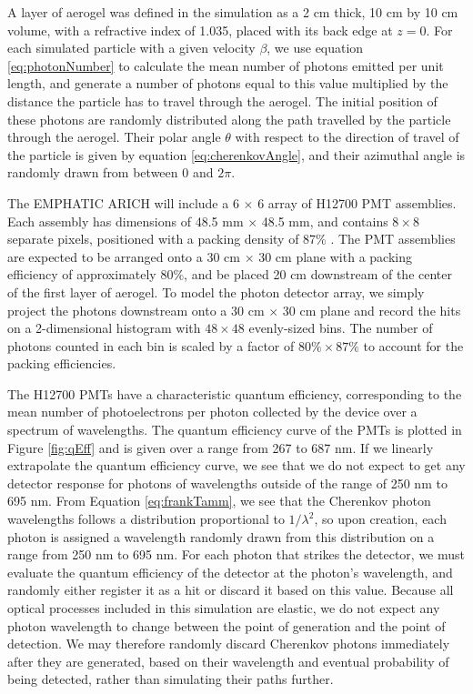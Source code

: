 A layer of aerogel was defined in the simulation as a 2 cm thick, 10 cm by 10 cm volume, with a refractive index of 1.035, placed with its back edge at $z=0$.
For each simulated particle with a given velocity $\beta$, we use equation \ref{eq:photonNumber} to calculate the mean number of photons emitted per unit length, and generate a number of photons equal to this value multiplied by the distance the particle has to travel through the aerogel.
The initial position of these photons are randomly distributed along the path travelled by the particle through the aerogel.
Their polar angle $\theta$ with respect to the direction of travel of the particle is given by equation \ref{eq:cherenkovAngle}, and their azimuthal angle is randomly drawn from between 0 and $2\pi$.

The EMPHATIC ARICH will include a 6 $\times$ 6 array of H12700 PMT assemblies. 
Each assembly has dimensions of 48.5 mm $\times$ 48.5 mm, and contains $8 \times 8$ separate pixels, positioned with a packing density of 87\% \cite{H12700}.
The PMT assemblies are expected to be arranged onto a 30 cm $\times$ 30 cm plane with a packing efficiency of approximately $80\%$, and be placed 20 cm downstream of the center of the first layer of aerogel.
To model the photon detector array, we simply project the photons downstream onto a 30 cm $\times$ 30 cm plane and record the hits on a 2-dimensional histogram with $48 \times 48$ evenly-sized bins.
The number of photons counted in each bin is scaled by a factor of $80\% \times 87\%$ to account for the packing efficiencies.

The H12700 PMTs have a characteristic quantum efficiency, corresponding to the mean number of photoelectrons per photon collected by the device over a spectrum of wavelengths.
The quantum efficiency curve of the PMTs is plotted in Figure \ref{fig:qEff} and is given over a range from 267 to 687 nm.
If we linearly extrapolate the quantum efficiency curve, we see that we do not expect to get any detector response for photons of wavelengths outside of the range of 250 nm to 695 nm.
From Equation \ref{eq:frankTamm}, we see that the Cherenkov photon wavelengths follows a distribution proportional to $1/\lambda^2$, so upon creation, each photon is assigned a wavelength randomly drawn from this distribution on a range from 250 nm to 695 nm.
For each photon that strikes the detector, we must evaluate the quantum efficiency of the detector at the photon's wavelength, and randomly either register it as a hit or discard it based on this value.
Because all optical processes included in this simulation are elastic, we do not expect any photon wavelength to change between the point of generation and the point of detection.
We may therefore randomly discard Cherenkov photons immediately after they are generated, based on their wavelength and eventual probability of being detected, rather than simulating their paths further.

